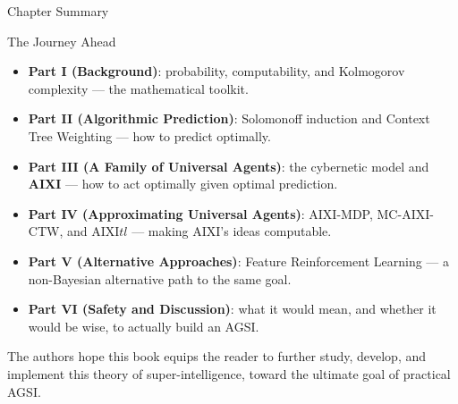 \documentclass[aspectratio=169,10pt]{beamer}
\begin{document}
\begin{frame}{Chapter Summary}
  \small
  \begin{block}{The Journey Ahead}
    \begin{itemize}\itemsep2pt
      \item \textbf{Part I (Background)}: probability, computability, and
        Kolmogorov complexity --- the mathematical toolkit.
      \item \textbf{Part II (Algorithmic Prediction)}: Solomonoff induction
        and Context Tree Weighting --- how to predict optimally.
      \item \textbf{Part III (A Family of Universal Agents)}: the cybernetic
        model and \textbf{AIXI} --- how to act optimally given optimal
        prediction.
      \item \textbf{Part IV (Approximating Universal Agents)}: AIXI-MDP,
        MC-AIXI-CTW, and AIXI$tl$ --- making AIXI's ideas computable.
      \item \textbf{Part V (Alternative Approaches)}: Feature Reinforcement
        Learning --- a non-Bayesian alternative path to the same goal.
      \item \textbf{Part VI (Safety and Discussion)}: what it would mean, and
        whether it would be wise, to actually build an AGSI.
    \end{itemize}
  \end{block}
  The authors hope this book equips the reader to further study, develop,
  and implement this theory of super-intelligence, toward the ultimate goal
  of practical AGSI.
\end{frame}
\end{document}
